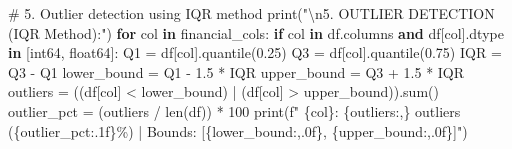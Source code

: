 \documentclass[
  letterpaper,
  DIV=11,
  numbers=noendperiod]{scrartcl}
\newenvironment{Shaded}{\begin{snugshade}}{\end{snugshade}}
\newcommand{\BuiltInTok}[1]{\textcolor[rgb]{0.00,0.23,0.31}{#1}}
\newcommand{\CharTok}[1]{\textcolor[rgb]{0.13,0.47,0.30}{#1}}
\newcommand{\CommentTok}[1]{\textcolor[rgb]{0.37,0.37,0.37}{#1}}
\newcommand{\ControlFlowTok}[1]{\textcolor[rgb]{0.00,0.23,0.31}{\textbf{#1}}}
\newcommand{\DecValTok}[1]{\textcolor[rgb]{0.68,0.00,0.00}{#1}}
\newcommand{\FloatTok}[1]{\textcolor[rgb]{0.68,0.00,0.00}{#1}}
\newcommand{\KeywordTok}[1]{\textcolor[rgb]{0.00,0.23,0.31}{\textbf{#1}}}
\newcommand{\NormalTok}[1]{\textcolor[rgb]{0.00,0.23,0.31}{#1}}
\newcommand{\OperatorTok}[1]{\textcolor[rgb]{0.37,0.37,0.37}{#1}}
\newcommand{\SpecialCharTok}[1]{\textcolor[rgb]{0.37,0.37,0.37}{#1}}
\newcommand{\SpecialStringTok}[1]{\textcolor[rgb]{0.13,0.47,0.30}{#1}}
\newcommand{\StringTok}[1]{\textcolor[rgb]{0.13,0.47,0.30}{#1}}
\begin{document}
\begin{Shaded}
\begin{Highlighting}[]
\CommentTok{\# 5. Outlier detection using IQR method}
\BuiltInTok{print}\NormalTok{(}\StringTok{"}\CharTok{\textbackslash{}n}\StringTok{5. OUTLIER DETECTION (IQR Method):"}\NormalTok{)}
\ControlFlowTok{for}\NormalTok{ col }\KeywordTok{in}\NormalTok{ financial\_cols:}
    \ControlFlowTok{if}\NormalTok{ col }\KeywordTok{in}\NormalTok{ df.columns }\KeywordTok{and}\NormalTok{ df[col].dtype }\KeywordTok{in}\NormalTok{ [}\StringTok{\textquotesingle{}int64\textquotesingle{}}\NormalTok{, }\StringTok{\textquotesingle{}float64\textquotesingle{}}\NormalTok{]:}
\NormalTok{        Q1 }\OperatorTok{=}\NormalTok{ df[col].quantile(}\FloatTok{0.25}\NormalTok{)}
\NormalTok{        Q3 }\OperatorTok{=}\NormalTok{ df[col].quantile(}\FloatTok{0.75}\NormalTok{)}
\NormalTok{        IQR }\OperatorTok{=}\NormalTok{ Q3 }\OperatorTok{{-}}\NormalTok{ Q1}
\NormalTok{        lower\_bound }\OperatorTok{=}\NormalTok{ Q1 }\OperatorTok{{-}} \FloatTok{1.5} \OperatorTok{*}\NormalTok{ IQR}
\NormalTok{        upper\_bound }\OperatorTok{=}\NormalTok{ Q3 }\OperatorTok{+} \FloatTok{1.5} \OperatorTok{*}\NormalTok{ IQR}
\NormalTok{        outliers }\OperatorTok{=}\NormalTok{ ((df[col] }\OperatorTok{\textless{}}\NormalTok{ lower\_bound) }\OperatorTok{|}\NormalTok{ (df[col] }\OperatorTok{\textgreater{}}\NormalTok{ upper\_bound)).}\BuiltInTok{sum}\NormalTok{()}
\NormalTok{        outlier\_pct }\OperatorTok{=}\NormalTok{ (outliers }\OperatorTok{/} \BuiltInTok{len}\NormalTok{(df)) }\OperatorTok{*} \DecValTok{100}
        \BuiltInTok{print}\NormalTok{(}\SpecialStringTok{f"   }\SpecialCharTok{\{}\NormalTok{col}\SpecialCharTok{\}}\SpecialStringTok{: }\SpecialCharTok{\{}\NormalTok{outliers}\SpecialCharTok{:,\}}\SpecialStringTok{ outliers (}\SpecialCharTok{\{}\NormalTok{outlier\_pct}\SpecialCharTok{:.1f\}}\SpecialStringTok{\%) | Bounds: [}\SpecialCharTok{\{}\NormalTok{lower\_bound}\SpecialCharTok{:,.0f\}}\SpecialStringTok{, }\SpecialCharTok{\{}\NormalTok{upper\_bound}\SpecialCharTok{:,.0f\}}\SpecialStringTok{]"}\NormalTok{)}


\end{Highlighting}
\end{Shaded}
\end{document}
